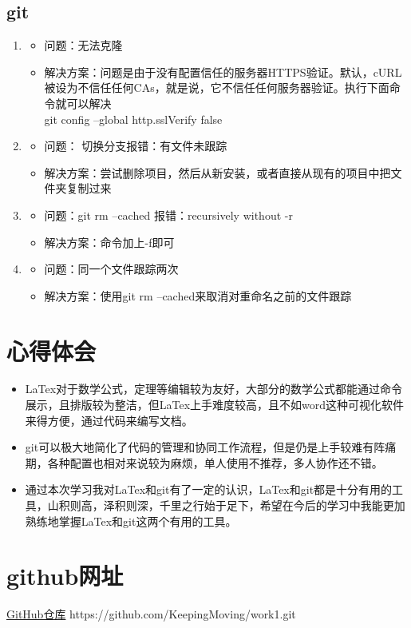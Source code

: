 \documentclass[UTF8]{ctexart}
\begin{document}
\subsection{git}
\begin{enumerate}
\item
\begin{itemize}
\item 问题：无法克隆
\item 解决方案：问题是由于没有配置信任的服务器HTTPS验证。默认，cURL被设为不信任任何CAs，就是说，它不信任任何服务器验证。执行下面命令就可以解决\\
git config --global http.sslVerify false
\end{itemize}
\item
\begin{itemize}
\item 问题： 切换分支报错：有文件未跟踪
\item 解决方案：尝试删除项目，然后从新安装，或者直接从现有的项目中把文件夹复制过来
\end{itemize}
\item
\begin{itemize}
\item 问题：git rm --cached 报错：recursively without -r
\item 解决方案：命令加上-f即可
\end{itemize}

\item
\begin{itemize}
\item 问题：同一个文件跟踪两次
\item 解决方案：使用git rm --cached来取消对重命名之前的文件跟踪
 \end{itemize}
\end{enumerate}




  \section{心得体会}
\begin{itemize}
  \item LaTex对于数学公式，定理等编辑较为友好，大部分的数学公式都能通过命令展示，且排版较为整洁，但LaTex上手难度较高，且不如word这种可视化软件来得方便，通过代码来编写文档。\\
  \item git可以极大地简化了代码的管理和协同工作流程，但是仍是上手较难有阵痛期，各种配置也相对来说较为麻烦，单人使用不推荐，多人协作还不错。\\
  \item 通过本次学习我对LaTex和git有了一定的认识，LaTex和git都是十分有用的工具，山积则高，泽积则深，千里之行始于足下，希望在今后的学习中我能更加熟练地掌握LaTex和git这两个有用的工具。
\end{itemize}

  

  \section{github网址}
\href{https://github.com/KeepingMoving/work1.git}{GitHub仓库}
https://github.com/KeepingMoving/work1.git
 
\end{document}
